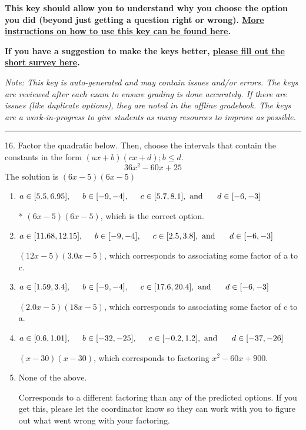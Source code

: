 \documentclass{article}[14pt]
\begin{document}
\textbf{This key should allow you to understand why you choose the option you did (beyond just getting a question right or wrong). \href{https://xronos.clas.ufl.edu/mac1105spring2020/courseDescriptionAndMisc/Exams/LearningFromResults}{More instructions on how to use this key can be found here}.}

\textbf{If you have a suggestion to make the keys better, \href{https://forms.gle/CZkbZmPbC9XALEE88}{please fill out the short survey here}.}

\textit{Note: This key is auto-generated and may contain issues and/or errors. The keys are reviewed after each exam to ensure grading is done accurately. If there are issues (like duplicate options), they are noted in the offline gradebook. The keys are a work-in-progress to give students as many resources to improve as possible.}

\rule{\textwidth}{0.4pt}

16. Factor the quadratic below. Then, choose the intervals that contain the constants in the form $(ax+b)(cx+d); b \leq d.$
$$ 36x^{2} -60 x + 25 $$ 
The solution is $ (6x -5)(6x -5) $ 

\begin{enumerate}[label=\Alph*.] 
\item $ a \in [5.5, 6.95], \hspace*{5mm} b \in [-9, -4], \hspace*{5mm} c \in [5.7, 8.1], \text{ and } \hspace*{5mm} d \in [-6, -3] $ 

 * $(6x -5)(6x -5)$, which is the correct option. 
\item $ a \in [11.68, 12.15], \hspace*{5mm} b \in [-9, -4], \hspace*{5mm} c \in [2.5, 3.8], \text{ and } \hspace*{5mm} d \in [-6, -3] $ 

  $(12x -5)(3.0x -5)$, which corresponds to associating some factor of a to c. 
\item $ a \in [1.59, 3.4], \hspace*{5mm} b \in [-9, -4], \hspace*{5mm} c \in [17.6, 20.4], \text{ and } \hspace*{5mm} d \in [-6, -3] $ 

  $(2.0x -5)(18x -5)$, which corresponds to associating some factor of c to a. 
\item $ a \in [0.6, 1.01], \hspace*{5mm} b \in [-32, -25], \hspace*{5mm} c \in [-0.2, 1.2], \text{ and } \hspace*{5mm} d \in [-37, -26] $ 

  $(x -30)(x -30)$, which corresponds to factoring $x^{2} -60 x + 900$. 
\item $ \text{None of the above.} $ 

  Corresponds to a different factoring than any of the predicted options. If you get this, please let the coordinator know so they can work with you to figure out what went wrong with your factoring. 
\end{enumerate} 
 
\end{document}
